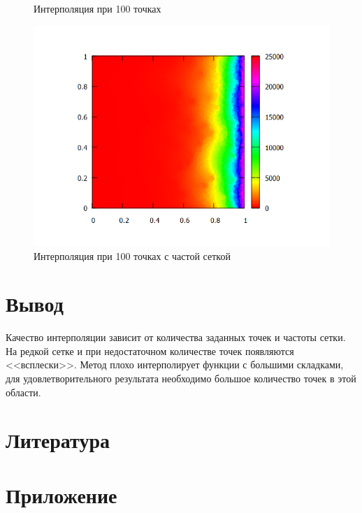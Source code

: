 \documentclass[14pt, a4paper]{extarticle}
\begin{document}
\begin{enumerate}
\begin{figure}[H]
\begin{minipage}{0.5\textwidth}
					\caption[.] {Интерполяция при 100 точках}
				\end{minipage}\hfill
			\end{figure}
			\begin{figure}[H]
				\centering
				\includegraphics[width = \linewidth]{../4func/M=100T=10182Err=0.150765.png}
				\caption[.] {Интерполяция при 100 точках с частой сеткой}
			\end{figure}
		\end{enumerate}
	\section{Вывод}
		Качество интерполяции зависит от количества заданных точек и частоты сетки. На редкой сетке и при недостаточном количестве точек появляются <<всплески>>. Метод плохо интерполирует функции с большими складками, для удовлетворительного результата необходимо большое количество точек в этой области.
	\section{Литература}
	\section{Приложение}
	
	
	
\end{document}
